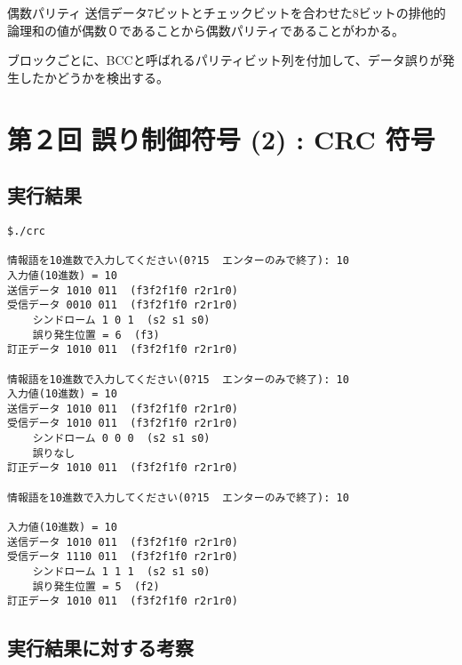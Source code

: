 \documentclass[a4j]{celb-report}
\begin{document}

偶数パリティ
送信データ7ビットとチェックビットを合わせた8ビットの排他的論理和の値が偶数０であることから偶数パリティであることがわかる。


ブロックごとに、BCCと呼ばれるパリティビット列を付加して、データ誤りが発生したかどうかを検出する。\cite{horizon}




\newpage

\section{第２回 誤り制御符号 (2) : CRC 符号}
\subsection{実行結果}
\begin{lstlisting}[basicstyle=\ttfamily\footnotesize, frame=single]
$./crc

情報語を10進数で入力してください(0?15  エンターのみで終了): 10
入力値(10進数) = 10
送信データ 1010 011  (f3f2f1f0 r2r1r0)
受信データ 0010 011  (f3f2f1f0 r2r1r0)
    シンドローム 1 0 1  (s2 s1 s0) 
    誤り発生位置 = 6  (f3)
訂正データ 1010 011  (f3f2f1f0 r2r1r0)

情報語を10進数で入力してください(0?15  エンターのみで終了): 10
入力値(10進数) = 10
送信データ 1010 011  (f3f2f1f0 r2r1r0)
受信データ 1010 011  (f3f2f1f0 r2r1r0)
    シンドローム 0 0 0  (s2 s1 s0) 
    誤りなし
訂正データ 1010 011  (f3f2f1f0 r2r1r0)

情報語を10進数で入力してください(0?15  エンターのみで終了): 10

入力値(10進数) = 10
送信データ 1010 011  (f3f2f1f0 r2r1r0)
受信データ 1110 011  (f3f2f1f0 r2r1r0)
    シンドローム 1 1 1  (s2 s1 s0) 
    誤り発生位置 = 5  (f2)
訂正データ 1010 011  (f3f2f1f0 r2r1r0)

\end{lstlisting}

\subsection{実行結果に対する考察}
\end{document}
